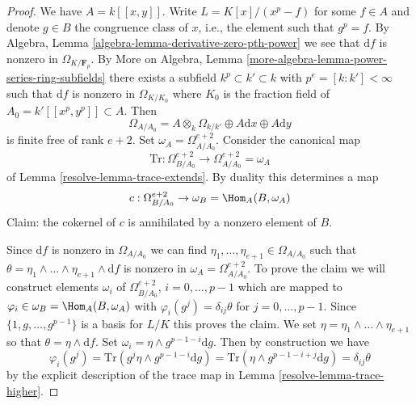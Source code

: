 \begin{proof}

We have $A = k[[x, y]]$. Write $L = K[x]/(x^p - f)$ for some $f \in A$
and denote $g \in B$ the congruence class of $x$, i.e., the element such
that $g^p = f$. By Algebra, Lemma \ref{algebra-lemma-derivative-zero-pth-power}
we see that $\text{d}f$ is nonzero in $\Omega_{K/\mathbf{F}_p}$. By
More on Algebra, Lemma \ref{more-algebra-lemma-power-series-ring-subfields}
there exists a subfield $k^p \subset k' \subset k$ with
$p^e = [k : k'] < \infty$ such that $\text{d}f$ is nonzero
in $\Omega_{K/K_0}$ where $K_0$ is the fraction field of
$A_0 = k'[[x^p, y^p]] \subset A$. Then
$$
\Omega_{A/A_0} =
A \otimes_k \Omega_{k/k'} \oplus A \text{d}x \oplus A \text{d}y
$$
is finite free of rank $e + 2$. Set $\omega_A = \Omega^{e + 2}_{A/A_0}$.
Consider the canonical map
$$
\text{Tr} :
\Omega^{e + 2}_{B/A_0}
\longrightarrow
\Omega^{e + 2}_{A/A_0} = \omega_A
$$
of Lemma \ref{resolve-lemma-trace-extends}. By duality this determines a map
$$
c : \Omega^{e + 2}_{B/A_0} \to \omega_B = \Hom_A(B, \omega_A)
$$
Claim: the cokernel of $c$ is annihilated by a nonzero element of $B$.

\medskip\noindent
Since $\text{d}f$ is nonzero in $\Omega_{A/A_0}$ we can find
$\eta_1, \ldots, \eta_{e + 1} \in \Omega_{A/A_0}$ such that
$\theta = \eta_1 \wedge \ldots \wedge \eta_{e + 1} \wedge \text{d}f$ is
nonzero in $\omega_A = \Omega^{e + 2}_{A/A_0}$. To prove the claim we
will construct elements $\omega_i$ of $\Omega^{e + 2}_{B/A_0}$,
$i = 0, \ldots, p - 1$ which are mapped to
$\varphi_i \in \omega_B = \Hom_A(B, \omega_A)$
with $\varphi_i(g^j) = \delta_{ij}\theta$ for $j = 0, \ldots, p - 1$.
Since $\{1, g, \ldots, g^{p - 1}\}$ is a basis for $L/K$ this
proves the claim. We set
$\eta = \eta_1 \wedge \ldots \wedge \eta_{e + 1}$
so that $\theta = \eta \wedge \text{d}f$.
Set $\omega_i = \eta \wedge g^{p - 1 - i}\text{d}g$. Then
by construction we have
$$
\varphi_i(g^j) = \text{Tr}(g^j \eta \wedge g^{p - 1 - i}\text{d}g) =
\text{Tr}(\eta \wedge g^{p - 1 - i + j}\text{d}g) = \delta_{ij} \theta
$$
by the explicit description of the trace map in Lemma \ref{resolve-lemma-trace-higher}.


\end{proof}
